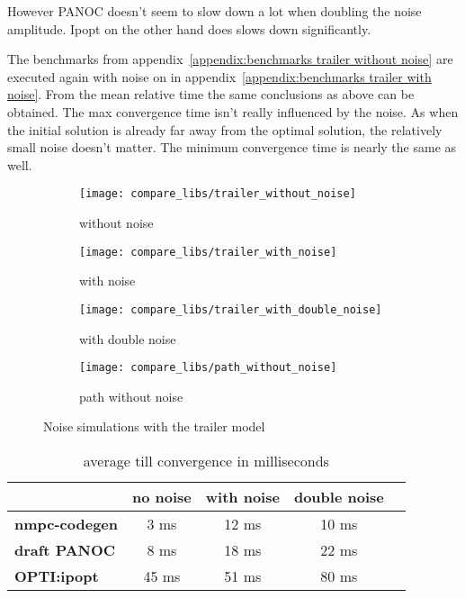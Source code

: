 However PANOC doesn't seem to slow down a lot when doubling the noise amplitude. Ipopt on the other hand does slows down significantly.

The benchmarks from appendix~\ref{appendix:benchmarks trailer without noise} are executed again with noise on in appendix~\ref{appendix:benchmarks trailer with noise}. From the mean relative time the same conclusions as above can be obtained. The max convergence time isn't really influenced by the noise. As when the initial solution is already far away from the optimal solution, the relatively small noise doesn't matter. The minimum convergence time is nearly the same as well. 

\begin{figure}[H]
	\centering
	\begin{subfigure}[b]{0.45\textwidth}
		\centering
		\texttt{[image: compare\_libs/trailer\_without\_noise]}
		\caption{without noise}
		\label{fig:timings trailer without noise}
	\end{subfigure}
	\hfill
	\begin{subfigure}[b]{0.45\textwidth}
		\centering
		\texttt{[image: compare\_libs/trailer\_with\_noise]}
		\caption{with noise}
		\label{fig:timings trailer with noise}
	\end{subfigure}
	\begin{subfigure}[b]{0.45\textwidth}
		\centering
		\texttt{[image: compare\_libs/trailer\_with\_double\_noise]}
		\caption{with double noise}
		\label{fig:timings trailer with double noise}
	\end{subfigure}
	\hfill
	\begin{subfigure}[b]{0.45\textwidth}
		\centering
		\texttt{[image: compare\_libs/path\_without\_noise]}
		\caption{path without noise}
		\label{fig:path noise simulations}
	\end{subfigure}
	\caption{Noise simulations with the trailer model}
	\label{fig:Noise simulations with the trailer model}
\end{figure}

\begin{table}[H]
	\centering
	\begin{tabular}{|l|c|c|c|c|}
		\hline
		&\textbf{no noise}&\textbf{with noise}&\textbf{double noise}\\\hline
		\textbf{nmpc-codegen}&3 ms&12 ms&10 ms \\\hline
		\textbf{draft PANOC}&8 ms&18 ms&22 ms \\\hline
		\textbf{OPTI:ipopt}&45 ms&51 ms&80 ms \\\hline
	\end{tabular}
	\caption{average till convergence in milliseconds}
	\label{tbl:average till convergence noise}
\end{table}

